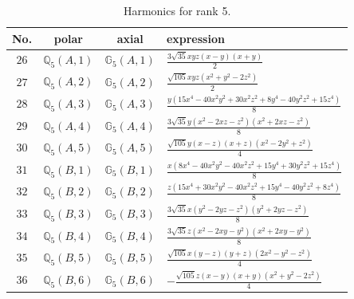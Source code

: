 \documentclass[fleqn,8pt,landscape]{jsarticle}
\begin{document}
\begin{table}[ht!]
\begin{center}
\caption{Harmonics for rank 5.}
\renewcommand{\arraystretch}{1.3}
\begin{tabular}{cccl} \hline \hline
No. & polar & axial & expression \\ \hline
$ 26 $ & $ \mathbb{Q}_{5}(A,1) $ & $ \mathbb{G}_{5}(A,1) $ & $ \frac{3 \sqrt{35} x y z \left(x - y\right) \left(x + y\right)}{2} $ \\
$ 27 $ & $ \mathbb{Q}_{5}(A,2) $ & $ \mathbb{G}_{5}(A,2) $ & $ \frac{\sqrt{105} x y z \left(x^{2} + y^{2} - 2 z^{2}\right)}{2} $ \\
$ 28 $ & $ \mathbb{Q}_{5}(A,3) $ & $ \mathbb{G}_{5}(A,3) $ & $ \frac{y \left(15 x^{4} - 40 x^{2} y^{2} + 30 x^{2} z^{2} + 8 y^{4} - 40 y^{2} z^{2} + 15 z^{4}\right)}{8} $ \\
$ 29 $ & $ \mathbb{Q}_{5}(A,4) $ & $ \mathbb{G}_{5}(A,4) $ & $ \frac{3 \sqrt{35} y \left(x^{2} - 2 x z - z^{2}\right) \left(x^{2} + 2 x z - z^{2}\right)}{8} $ \\
$ 30 $ & $ \mathbb{Q}_{5}(A,5) $ & $ \mathbb{G}_{5}(A,5) $ & $ \frac{\sqrt{105} y \left(x - z\right) \left(x + z\right) \left(x^{2} - 2 y^{2} + z^{2}\right)}{4} $ \\
$ 31 $ & $ \mathbb{Q}_{5}(B,1) $ & $ \mathbb{G}_{5}(B,1) $ & $ \frac{x \left(8 x^{4} - 40 x^{2} y^{2} - 40 x^{2} z^{2} + 15 y^{4} + 30 y^{2} z^{2} + 15 z^{4}\right)}{8} $ \\
$ 32 $ & $ \mathbb{Q}_{5}(B,2) $ & $ \mathbb{G}_{5}(B,2) $ & $ \frac{z \left(15 x^{4} + 30 x^{2} y^{2} - 40 x^{2} z^{2} + 15 y^{4} - 40 y^{2} z^{2} + 8 z^{4}\right)}{8} $ \\
$ 33 $ & $ \mathbb{Q}_{5}(B,3) $ & $ \mathbb{G}_{5}(B,3) $ & $ \frac{3 \sqrt{35} x \left(y^{2} - 2 y z - z^{2}\right) \left(y^{2} + 2 y z - z^{2}\right)}{8} $ \\
$ 34 $ & $ \mathbb{Q}_{5}(B,4) $ & $ \mathbb{G}_{5}(B,4) $ & $ \frac{3 \sqrt{35} z \left(x^{2} - 2 x y - y^{2}\right) \left(x^{2} + 2 x y - y^{2}\right)}{8} $ \\
$ 35 $ & $ \mathbb{Q}_{5}(B,5) $ & $ \mathbb{G}_{5}(B,5) $ & $ \frac{\sqrt{105} x \left(y - z\right) \left(y + z\right) \left(2 x^{2} - y^{2} - z^{2}\right)}{4} $ \\
$ 36 $ & $ \mathbb{Q}_{5}(B,6) $ & $ \mathbb{G}_{5}(B,6) $ & $ - \frac{\sqrt{105} z \left(x - y\right) \left(x + y\right) \left(x^{2} + y^{2} - 2 z^{2}\right)}{4} $ \\
 \hline \hline
\end{tabular}
\end{center}
\end{table}
\end{document}
